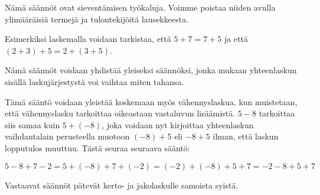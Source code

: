 
Nämä säännöt ovat sieventämisen työkaluja. Voimme poistaa niiden avulla ylimääräisiä termejä ja tulontekijöitä lausekkeesta. 

\begin{esimerkki} 

 \begin{alakohdat}
\end{alakohdat}
\end{esimerkki}


Esimerkiksi laskemalla voidaan tarkistaa, että $5+7=7+5$ ja että $(2+3)+5=2+(3+5)$.

Nämä säännöt voidaan yhdistää yleiseksi säännöksi, jonka mukaan yhteenlaskun sisällä laskujärjestystä voi vaihtaa miten tahansa.

Tämä sääntö voidaan yleistää koskemaan myös vähennyslaskua, kun muistetaan, että vähennyslasku tarkoittaa oikeastaan vastaluvun lisäämistä. $5-8$ tarkoittaa siis samaa kuin $5+(-8)$, joka voidaan nyt kirjoittaa yhteenlaskun vaihdantalain perusteella muotoon $(-8)+5$ eli $-8+5$ ilman, että laskun lopputulos muuttuu. Tästä seuraa seuraava sääntö:


\begin{esimerkki} 
$5-8+7-2=5+(-8)+7+(-2)=(-2)+(-8)+5+7=-2-8+5+7$ 
\end{esimerkki}

Vastaavat säännöt pätevät kerto- ja jakolaskulle samoista syistä.




